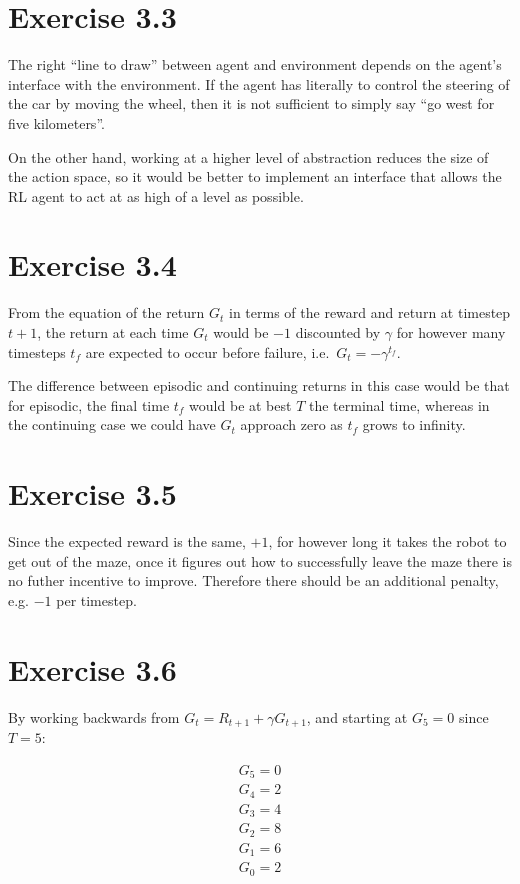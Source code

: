 \documentclass[a4paper, 12pt, titlepage]{article}
\begin{document}
\section{Exercise 3.3}

The right ``line to draw'' between agent and environment depends on the agent's
interface with the environment. If the agent has literally to control the
steering of the car by moving the wheel, then it is not sufficient to simply
say ``go west for five kilometers''.

On the other hand, working at a higher level of abstraction reduces the size of
the action space, so it would be better to implement an interface that allows
the RL agent to act at as high of a level as possible.


\section{Exercise 3.4}

From the equation of the return $G_t$ in terms of the reward and return at
timestep $t + 1$, the return at each time $G_t$ would be $-1$ discounted by
$\gamma$ for however many timesteps $t_f$ are expected to occur before failure,
i.e.\ $G_t = -\gamma^{t_f}$.

The difference between episodic and continuing returns in this case would be
that for episodic, the final time $t_f$ would be at best $T$ the terminal time,
whereas in the continuing case we could have $G_t$ approach zero as $t_f$ grows
to infinity.


\section{Exercise 3.5}

Since the expected reward is the same, $+1$, for however long it takes the
robot to get out of the maze, once it figures out how to successfully leave the
maze there is no futher incentive to improve. Therefore there should be an
additional penalty, e.g. $-1$ per timestep.


\section{Exercise 3.6}

By working backwards from $G_t = R_{t + 1} + \gamma G_{t + 1}$, and starting at
$G_5 = 0$ since $T = 5$:

\begin{align*}
        G_5 = 0\\
        G_4 = 2\\
        G_3 = 4\\
        G_2 = 8\\
        G_1 = 6\\
        G_0 = 2
\end{align*}
\end{document}
